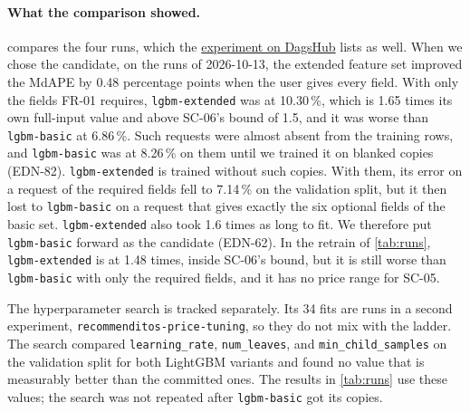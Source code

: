 \paragraph{What the comparison showed.}
 compares the four runs, which the \href{https://dagshub.com/recommenditos/MLOPS_Recommenditos/experiments}{experiment on DagsHub} lists as well.
When we chose the candidate, on the runs of 2026-10-13, the extended feature set improved the MdAPE by 0.48 percentage points when the user gives every field.
With only the fields FR-01 requires, \texttt{lgbm-extended} was at 10.30\,\%, which is 1.65 times its own full-input value and above SC-06's bound of 1.5, and it was worse than \texttt{lgbm-basic} at 6.86\,\%.
Such requests were almost absent from the training rows, and \texttt{lgbm-basic} was at 8.26\,\% on them until we trained it on blanked copies (EDN-82).
\texttt{lgbm-extended} is trained without such copies.
With them, its error on a request of the required fields fell to 7.14\,\% on the validation split, but it then lost to \texttt{lgbm-basic} on a request that gives exactly the six optional fields of the basic set.
\texttt{lgbm-extended} also took 1.6 times as long to fit.
We therefore put \texttt{lgbm-basic} forward as the candidate (EDN-62).
In the retrain of \cref{tab:runs}, \texttt{lgbm-extended} is at 1.48 times, inside SC-06's bound, but it is still worse than \texttt{lgbm-basic} with only the required fields, and it has no price range for SC-05.

The hyperparameter search is tracked separately.
Its 34 fits are runs in a second experiment, \texttt{recommenditos-price-tuning}, so they do not mix with the ladder.
The search compared \texttt{learning\_rate}, \texttt{num\_leaves}, and \texttt{min\_child\_samples} on the validation split for both LightGBM variants and found no value that is measurably better than the committed ones.
The results in \cref{tab:runs} use these values; the search was not repeated after \texttt{lgbm-basic} got its copies.
